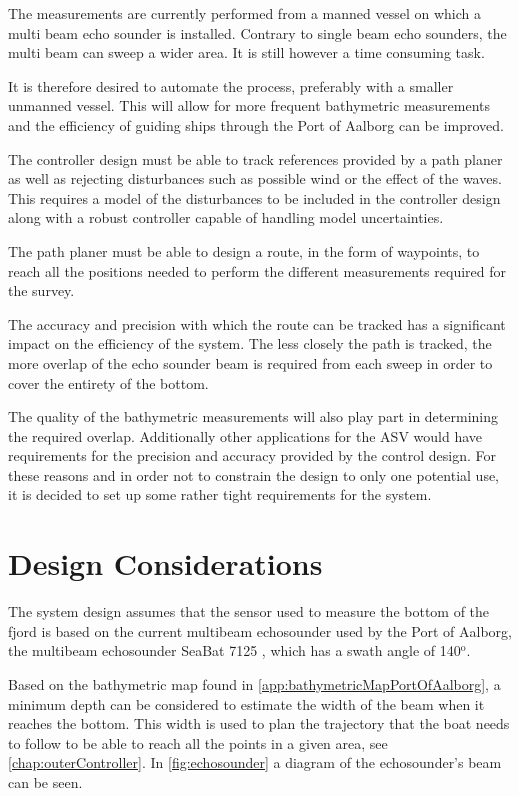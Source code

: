 The measurements are currently performed from a manned vessel on which a multi beam echo sounder is installed. Contrary to single beam echo sounders, the multi beam can sweep a wider area. It is still however a time consuming task.

It is therefore desired to automate the process, preferably with a smaller unmanned vessel. This will allow for more frequent bathymetric measurements and the efficiency of guiding ships through the Port of Aalborg can be improved.

The controller design must be able to track references provided by a path planer as well as rejecting disturbances such as possible wind or the effect of the waves. This requires a model of the disturbances to be included in the controller design along with a robust controller capable of handling model uncertainties.

The path planer must be able to design a route, in the form of waypoints, to reach all the positions needed to perform the different measurements required for the survey.

The accuracy and precision with which the route can be tracked has a significant impact on the efficiency of the system. The less closely the path is tracked, the more overlap of the echo sounder beam is required from each sweep in order to cover the entirety of the bottom.

The quality of the bathymetric measurements will also play part in determining the required overlap. Additionally other applications for the ASV would have requirements for the precision and accuracy provided by the control design. For these reasons and in order not to constrain the design to only one potential use, it is decided to set up some rather tight requirements for the system.

\section{Design Considerations}\label{sec:designconsiderations}
The system design assumes that the sensor used to measure the bottom of the fjord is based on the current multibeam echosounder used by the Port of Aalborg, the multibeam echosounder SeaBat 7125 \cite{echoSounder}, which has a swath angle of 140$^\mathrm{o}$.

Based on the bathymetric map found in \autoref{app:bathymetricMapPortOfAalborg}, a minimum depth can be considered to estimate the width of the beam when it reaches the bottom. This width is used to plan the trajectory that the boat needs to follow to be able to reach all the points in a given area, see \autoref{chap:outerController}. In \autoref{fig:echosounder} a diagram of the echosounder's beam can be seen.

